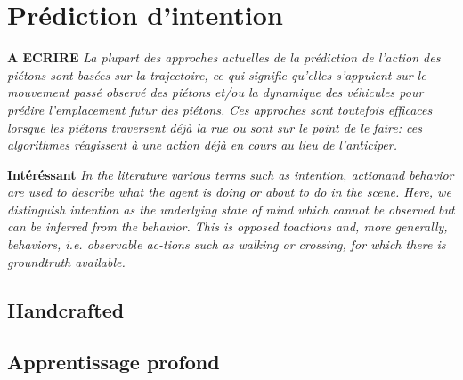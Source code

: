 \section{Prédiction d'intention}

\textbf{A ECRIRE}
\textit{La plupart des approches actuelles de la prédiction de l'action des piétons sont basées sur la trajectoire, ce qui signifie qu'elles s'appuient sur le mouvement passé observé des piétons et/ou la dynamique des véhicules pour prédire l'emplacement futur des piétons. Ces approches sont toutefois efficaces lorsque les piétons traversent déjà la rue ou sont sur le point de le faire: ces algorithmes réagissent à une action déjà en cours au lieu de l'anticiper.}


\textbf{Intéréssant}
\textit{In the literature various terms such as intention, actionand behavior are used to describe what the agent is doing or about to do in the scene. Here, we distinguish intention as the underlying state of mind which cannot be observed but can be inferred from the behavior. This is opposed toactions and, more generally, behaviors, i.e. observable ac-tions such as walking or crossing, for which there is groundtruth available.}




\subsection{Handcrafted}
\subsection{Apprentissage profond}


